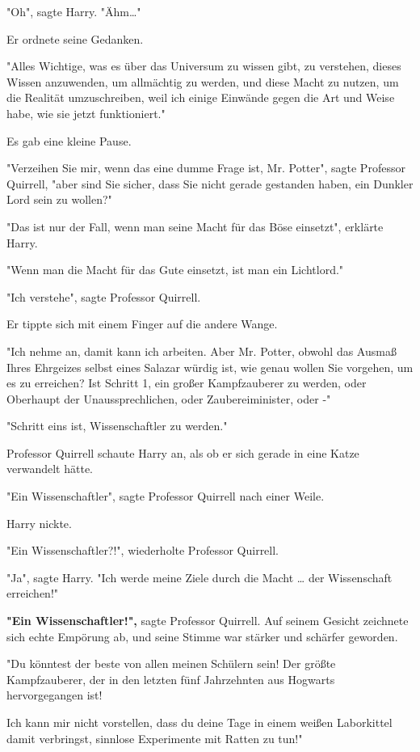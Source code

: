 {"Oh", sagte Harry. "Ähm…"

Er ordnete seine Gedanken.

"Alles Wichtige, was es über das Universum zu wissen gibt, zu verstehen, dieses Wissen anzuwenden, um allmächtig zu werden, und diese Macht zu nutzen, um die Realität umzuschreiben, weil ich einige Einwände gegen die Art und Weise habe, wie sie jetzt funktioniert."

Es gab eine kleine Pause.

"Verzeihen Sie mir, wenn das eine dumme Frage ist, Mr. Potter", sagte Professor Quirrell, "aber sind Sie sicher, dass Sie nicht gerade gestanden haben, ein Dunkler Lord sein zu wollen?"

"Das ist nur der Fall, wenn man seine Macht für das Böse einsetzt", erklärte Harry.

"Wenn man die Macht für das Gute einsetzt, ist man ein Lichtlord."

"Ich verstehe", sagte Professor Quirrell.

Er tippte sich mit einem Finger auf die andere Wange.

"Ich nehme an, damit kann ich arbeiten. Aber Mr. Potter, obwohl das Ausmaß Ihres Ehrgeizes selbst eines Salazar würdig ist, wie genau wollen Sie vorgehen, um es zu erreichen? Ist Schritt 1, ein großer Kampfzauberer zu werden, oder Oberhaupt der Unaussprechlichen, oder Zaubereiminister, oder -"

"Schritt eins ist, Wissenschaftler zu werden."

Professor Quirrell schaute Harry an, als ob er sich gerade in eine Katze verwandelt hätte.

"Ein Wissenschaftler", sagte Professor Quirrell nach einer Weile.

Harry nickte.

"Ein Wissenschaftler?!", wiederholte Professor Quirrell.

"Ja", sagte Harry. "Ich werde meine Ziele durch die Macht … der Wissenschaft erreichen!"

\textbf{"Ein Wissenschaftler!",} sagte Professor Quirrell. Auf seinem Gesicht zeichnete sich echte Empörung ab, und seine Stimme war stärker und schärfer geworden.

"Du könntest der beste von allen meinen Schülern sein! Der größte Kampfzauberer, der in den letzten fünf Jahrzehnten aus Hogwarts hervorgegangen ist!

Ich kann mir nicht vorstellen, dass du deine Tage in einem weißen Laborkittel damit verbringst, sinnlose Experimente mit Ratten zu tun!"

}
